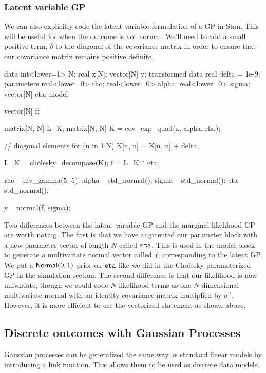 \subsubsection{Latent variable GP}

We can also explicitly code the latent variable formulation of a GP in Stan.
This will be useful for when the outcome is not normal. We'll need to add a
small positive term, $\delta$ to the diagonal of the covariance matrix in order
to ensure that our covariance matrix remains positive definite.

%
\begin{stancode}
data {
  int<lower=1> N;
  real x[N];
  vector[N] y;
}
transformed data {
  real delta = 1e-9;
}
parameters {
  real<lower=0> rho;
  real<lower=0> alpha;
  real<lower=0> sigma;
  vector[N] eta;
}
model {
  vector[N] f;
  {
    matrix[N, N] L_K;
    matrix[N, N] K = cov_exp_quad(x, alpha, rho);

    // diagonal elements
    for (n in 1:N)
      K[n, n] = K[n, n] + delta;

    L_K = cholesky_decompose(K);
    f = L_K * eta;
  }

  rho ~ inv_gamma(5, 5);
  alpha ~ std_normal();
  sigma ~ std_normal();
  eta ~ std_normal();

  y ~ normal(f, sigma);
}
\end{stancode}
%

Two differences between the latent variable GP and the marginal likelihood GP
are worth noting. The first is that we have augmented our parameter block with
a new parameter vector of length $N$ called ${\tt eta}$. This is used in the model
block to generate a multivariate normal vector called $f$, corresponding to the
latent GP. We put a $\mbox{\sf Normal}(0,1)$ prior on ${\tt eta}$ like we did in the
Cholesky-parameterized GP in the simulation section.  The second difference is
that our likelihood is now univariate, though we could code $N$ likelihood
terms as one $N$-dimensional multivariate normal with an identity covariance
matrix multiplied by $\sigma^2$. However, it is more efficient to use the
vectorized statement as shown above.

\subsection{Discrete outcomes with Gaussian Processes}

Gaussian processes can be generalized the same way as standard linear
models by introducing a link function.  This allows them to be used as
discrete data models.

